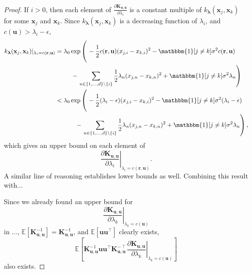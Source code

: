 \documentclass{article}
\theoremstyle{definition}
\theoremstyle{remark}
\newcommand{\Kuu}{\mathbf{K}_{\mathbf{u},\mathbf{u}}}
\begin{document}
\begin{proof}
  If $i > 0$, then each element of $\frac{\partial \Kuu}{\partial
    \lambda_i}$ is a constant multiple of $k_{\bm\lambda}(\mathbf{x}_j,
  \mathbf{x}_k)$ for some $\mathbf{x}_j$ and $\mathbf{x}_k$. Since
  $k_{\bm\lambda}(\mathbf{x}_j, \mathbf{x}_k)$ is a decreasing function of
  $\lambda_i$, and $c(\mathbf{u}) > \lambda_i - \epsilon$,
  \[
    \begin{split}
      k_{\bm\lambda}(\mathbf{x}_j, \mathbf{x}_k)|_{\lambda_i = 
        c(\mathbf{r}, \mathbf{u})} &=
      \begin{multlined}[t]
        \lambda_0 \exp \left( \vphantom{\sum_{n \in \{ \} \setminus}}
        \right. -\frac{1}{2}c(\mathbf{r}, \mathbf{u})(x_{j,i} - x_{k,i})^2 -
        \mathbbm{1}[j \ne k]\sigma^2c(\mathbf{r}, \mathbf{u}) \\
        - \left. \sum_{n \in \{ 1, \dots, d \} \setminus \{ i \}}
          \frac{1}{2} \lambda_n(x_{j,n} - x_{k,n})^2 + \mathbbm{1}[j \ne
          k]\sigma^2 \lambda_n \right)
      \end{multlined} \\
      &<
      \begin{multlined}[t]
        \lambda_0 \exp \left( \vphantom{\sum_{n \in \{ \} \setminus}}
        \right. -\frac{1}{2}(\lambda_i - \epsilon)(x_{j,i} - x_{k,i})^2 -
        \mathbbm{1}[j \ne k]\sigma^2(\lambda_i - \epsilon) \\
        - \left. \sum_{n \in \{ 1, \dots, d \} \setminus \{ i \}}
          \frac{1}{2} \lambda_n(x_{j,n} - x_{k,n})^2 + \mathbbm{1}[j \ne
          k]\sigma^2 \lambda_n \right),
      \end{multlined}
    \end{split}
  \]
  which gives an upper bound on each element of
  \[
    \left. \frac{\partial \Kuu}{\partial \lambda_i} \right|_{\lambda_i =
      c(\mathbf{r}, \mathbf{u})}.
  \]
  A similar line of reasoning establishes lower bounds as well. Combining this
  result with...

  Since we already found an upper bound for
  \[
    \left. \frac{\partial \Kuu}{\partial \lambda_k} \right|_{\lambda_k =
      c(\mathbf{u})}
  \]
  in ..., $\mathbb{E}[\Kuu^{-1}] = \Kuu^{-1}$, and
  $\mathbb{E}[\mathbf{u}\mathbf{u}^\intercal]$ clearly exists,
  \[
    \mathbb{E} \left[
      \Kuu^{-1}\mathbf{u}\mathbf{u}^\intercal\Kuu^{-\intercal} \left.
        \frac{\partial \Kuu}{\partial \lambda_k} \right|_{\lambda_k =
        c(\mathbf{u})} \right]
  \]
  also exists.
\end{proof}
\end{document}
